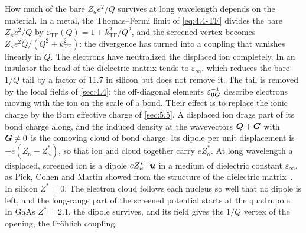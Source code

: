 How much of the bare $Z_\kappa e^2/Q$ survives at long wavelength depends on the material. In a metal, the Thomas--Fermi limit of \cref{eq:4.4-TF} divides the bare $Z_\kappa e^2/Q$ by $\varepsilon_{\mathrm{TF}}(Q) = 1 + k_{\mathrm{TF}}^2/Q^2$, and the screened vertex becomes $Z_\kappa e^2Q/(Q^2 + k_{\mathrm{TF}}^2)$: the divergence has turned into a coupling that vanishes linearly in $Q$. The electrons have neutralized the displaced ion completely. In an insulator the head of the dielectric matrix tends to $\varepsilon_\infty$, which reduces the bare $1/Q$ tail by a factor of 11.7 in silicon but does not remove it. The tail is removed by the local fields of \cref{sec:4.4}: the off-diagonal elements $\varepsilon^{-1}_{\bm{0}\bm{G}}$ describe electrons moving with the ion on the scale of a bond. Their effect is to replace the ionic charge by the Born effective charge of \cref{sec:5.5}. A displaced ion drags part of its bond charge along, and the induced density at the wavevectors $\bm{Q} + \bm{G}$ with $\bm{G} \ne 0$ is the comoving cloud of bond charge. Its dipole per unit displacement is $-e(Z_\kappa - Z^*_\kappa)$, so that ion and cloud together carry $eZ^*_\kappa$. At long wavelength a displaced, screened ion is a dipole $eZ^*_\kappa\cdot\bm{u}$ in a medium of dielectric constant $\varepsilon_\infty$, as Pick, Cohen and Martin showed from the structure of the dielectric matrix~\cite{pick1970microscopic}. In silicon $Z^* = 0$. The electron cloud follows each nucleus so well that no dipole is left, and the long-range part of the screened potential starts at the quadrupole. In GaAs $Z^* = 2.1$, the dipole survives, and its field gives the $1/Q$ vertex of the opening, the Fr\"ohlich coupling.


